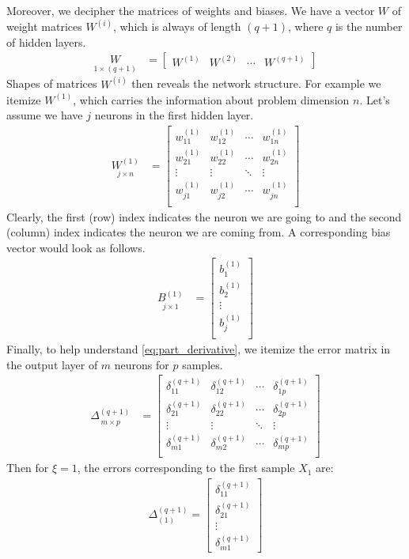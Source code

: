 Moreover, we decipher the matrices of weights and biases. We have a vector $ W $ of weight matrices $ W^{(i)} $, which is always of length $ (q+1) $, where $ q $ is the number of hidden layers.
\begin{align*}
\underset{1\times (q+1)}{W} &= 
\begin{bmatrix}
    W^{(1)} & W^{(2)} & \cdots & W^{(q+1)}
\end{bmatrix}
\end{align*}
Shapes of matrices $ W^{(i)} $ then reveals the network structure. For example we itemize $ W^{(1)} $, which carries the information about problem dimension $ n $. Let's assume we have $ j $ neurons in the first hidden layer.
\begin{align*}
\underset{j\times n}{W^{(1)}} &=
\begin{bmatrix}
    w_{11}^{(1)} & w_{12}^{(1)} & \cdots & w_{1n}^{(1)} \\
    w_{21}^{(1)} & w_{22}^{(1)} & \cdots & w_{2n}^{(1)} \\
    \vdots & \vdots & \ddots & \vdots \\
    w_{j1}^{(1)} & w_{j2}^{(1)} & \cdots & w_{jn}^{(1)} \\      
\end{bmatrix}
\end{align*}
Clearly, the first (row) index indicates the neuron we are going to and the second (column) index indicates the neuron we are coming from. A corresponding bias vector would look as follows.
\begin{align*}
\underset{j\times 1}{B^{(1)}} &=
\begin{bmatrix}
    b_{1}^{(1)} \\
    b_{2}^{(1)} \\
    \vdots \\
    b_{j}^{(1)} \\      
\end{bmatrix}
\end{align*}
Finally, to help understand \cref{eq:part_derivative}, we itemize the error matrix in the output layer of $ m $ neurons for $ p $ samples.
\begin{align*}
\underset{m\times p}{\Delta^{(q+1)}} &=
\begin{bmatrix}
    \delta_{11}^{(q+1)} & \delta_{12}^{(q+1)} & \cdots & \delta_{1p}^{(q+1)} \\
    \delta_{21}^{(q+1)} & \delta_{22}^{(q+1)} & \cdots & \delta_{2p}^{(q+1)} \\
    \vdots & \vdots & \ddots & \vdots \\
    \delta_{m1}^{(q+1)} & \delta_{m2}^{(q+1)} & \cdots & \delta_{mp}^{(q+1)} \\      
\end{bmatrix}
\end{align*}
Then for $ \xi = 1 $, the errors corresponding to the first sample $ X_1 $ are:
\begin{align*}
\Delta_{(1)}^{(q+1)} = \begin{bmatrix} \delta_{11}^{(q+1)} \\ \delta_{21}^{(q+1)} \\ \vdots \\ \delta_{m1}^{(q+1)} \end{bmatrix}
\end{align*}